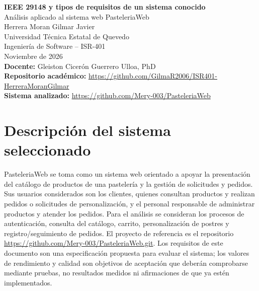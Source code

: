 \documentclass[11pt,a4paper]{article}
\begin{document}
\begin{center}
  {\Large\bfseries IEEE 29148 y tipos de requisitos de un sistema conocido}\\[0.4em]
  {\large Análisis aplicado al sistema web PasteleriaWeb}\\[0.8em]
  Herrera Moran Gilmar Javier\\
  Universidad Técnica Estatal de Quevedo\\
  Ingeniería de Software -- ISR-401\\
  Noviembre de 2026\\[0.8em]
  \textbf{Docente:} Gleiston Cicerón Guerrero Ulloa, PhD\\
  \textbf{Repositorio académico:} \url{https://github.com/GilmaR2006/ISR401-HerreraMoranGilmar}\\
  \textbf{Sistema analizado:} \url{https://github.com/Mery-003/PasteleriaWeb}
\end{center}

\begin{abstract}
Este informe aplica los fundamentos de la norma ISO/IEC/IEEE 29148:2018 al sistema web PasteleriaWeb, utilizado como caso de estudio para identificar y especificar necesidades de clientes y personal de una pastelería. Se sintetizan los criterios para redactar requisitos bien formados, se presenta un glosario, y se proponen quince requisitos clasificados por tipo. Cinco requisitos de calidad se relacionan con características y subcaracterísticas de ISO/IEC 25010:2023 y se expresan mediante métricas y umbrales verificables. Finalmente, se incluye una revisión de calidad de los enunciados y una reflexión sobre el proceso de especificación.
\end{abstract}

\section{Descripción del sistema seleccionado}
PasteleriaWeb se toma como un sistema web orientado a apoyar la presentación del catálogo de productos de una pastelería y la gestión de solicitudes y pedidos. Sus usuarios considerados son los clientes, quienes consultan productos y realizan pedidos o solicitudes de personalización, y el personal responsable de administrar productos y atender los pedidos. Para el análisis se consideran los procesos de autenticación, consulta del catálogo, carrito, personalización de postres y registro/seguimiento de pedidos. El proyecto de referencia es el repositorio \url{https://github.com/Mery-003/PasteleriaWeb.git}. Los requisitos de este documento son una especificación propuesta para evaluar el sistema; los valores de rendimiento y calidad son objetivos de aceptación que deberán comprobarse mediante pruebas, no resultados medidos ni afirmaciones de que ya estén implementados.
\end{document}
